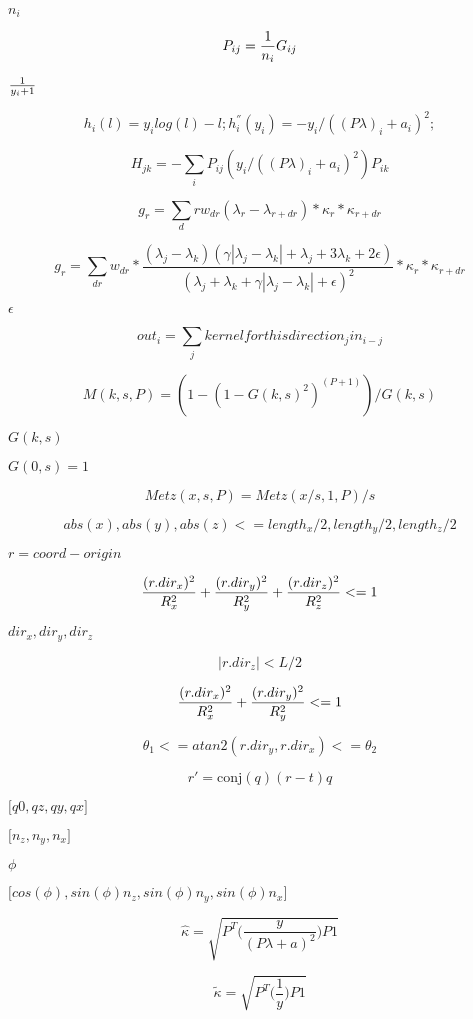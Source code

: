 \documentclass{article}
\begin{document}
$n_i$
\pagebreak

\[ P_{ij} = {1 \over n_i } G_{ij}\]
\pagebreak

$1 \over y_i+1 $
\pagebreak

\[ h_i(l) = y_i log (l) - l; h_i^{''}(y_i) = - y_i / ((P \lambda)_i + a_i)^2; \]
\pagebreak

\[ H_{jk} = - \sum_i P_{ij}(y_i / ((P \lambda)_i + a_i)^2) P_{ik} \]
\pagebreak

\[ g_r = \sum_dr w_{dr} (\lambda_r - \lambda_{r+dr}) * \kappa_r * \kappa_{r+dr} \]
\pagebreak

\[ g_r = \sum_{dr} w_{dr} * \frac{\left(\lambda_{j}-\lambda_{k}\right)\left(\gamma\left|\lambda_{j}-\lambda_{k}\right|+\lambda_{j}+3 \lambda_{k} + 2 \epsilon \right)} {\left(\lambda_{j}+\lambda_{k}+\gamma\left|\lambda_{j}-\lambda_{k}\right| + \epsilon \right)^{2}} * \kappa_r * \kappa_{r+dr} \]
\pagebreak

$\epsilon$
\pagebreak

\[ out_i = \sum_j kernelforthisdirection_j in_{i-j} \]
\pagebreak

\[ M(k,s,P) = (1 - (1 - G(k, s)^2)^{(P + 1)})/ G(k, s) \]
\pagebreak

$ G(k,s) $
\pagebreak

$G(0,s) = 1$
\pagebreak

\[ Metz(x,s,P) = Metz(x/s, 1 ,P)/s \]
\pagebreak

\[ abs(x), abs(y), abs(z) <= length_x/2, length_y/2, length_z/2 \]
\pagebreak

$r = coord - origin$
\pagebreak

\[ {(r.dir_x)^2 \over R_x^2} + {(r.dir_y)^2 \over R_y^2} + {(r.dir_z)^2 \over R_z^2} <= 1 \]
\pagebreak

$dir_x, dir_y, dir_z$
\pagebreak

\[ |r.dir_z|<L/2 \]
\pagebreak

\[ {(r.dir_x)^2 \over R_x^2} + {(r.dir_y)^2 \over R_y^2} <= 1 \]
\pagebreak

\[ \theta_1 <= atan2(r.dir_y,r.dir_x) <= \theta_2 \]
\pagebreak

\[ r' = \mathrm{conj}(q)(r-t)q \]
\pagebreak

${[}q0,qz,qy,qx{]}$
\pagebreak

${[}n_z,n_y,n_x{]}$
\pagebreak

$\phi$
\pagebreak

${[}cos(\phi),sin(\phi) n_z, sin(\phi) n_y, sin(\phi)n_x{]}$
\pagebreak

\[ \hat\kappa = \sqrt{ P^T \bigg( \frac{y}{ (P\lambda+a)^2 } \bigg) P1 } \]
\pagebreak

\[ \tilde\kappa = \sqrt{ P^T \bigg( \frac{1}{y} \bigg)P1 } \]
\pagebreak
\end{document}
